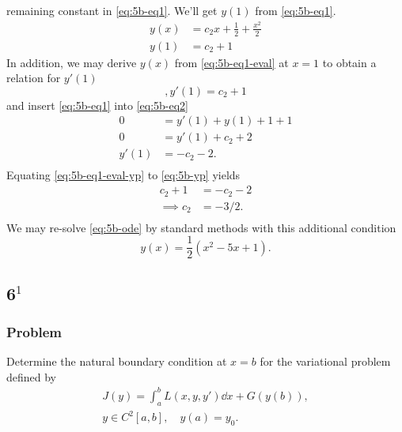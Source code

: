 \documentclass[12pt,twoside]{article}
\begin{document}
remaining constant in \cref{eq:5b-eq1}. We'll get $y(1)$ from \cref{eq:5b-eq1}.
\begin{equation}
  \label{eq:5b-eq1-eval}
  \begin{aligned}
    y(x) &= c_2x + \frac{1}{2} + \frac{x^2}{2} \\
    y(1) &= c_2 + 1
  \end{aligned}
\end{equation}
In addition, we may derive $y(x)$ from \cref{eq:5b-eq1-eval} at $x=1$ to obtain
a relation for $y'(1)$
\begin{equation}
  \label{eq:5b-eq1-eval-yp},
  y'(1) = c_2 + 1
\end{equation}
and insert \cref{eq:5b-eq1} into \cref{eq:5b-eq2}
\begin{equation}
  \label{eq:5b-yp}
  \begin{aligned}
    0 &= y'(1) + y(1) + 1  + 1 \\
    0 &= y'(1) + c_2 + 2 \\
    y'(1) &= -c_2 - 2. \\
  \end{aligned}
\end{equation}
Equating \cref{eq:5b-eq1-eval-yp} to \cref{eq:5b-yp} yields
\begin{equation*}
  \begin{aligned}
    c_2 + 1 &= -c_2 - 2 \\
    \implies c_2 &= -3/2. \\
  \end{aligned}
\end{equation*}
We may re-solve \cref{eq:5b-ode} by standard methods with this additional condition
\begin{equation*}
\boxed{y(x) = \frac{1}{2} \left(x^2-5 x+1\right).}
\end{equation*}

\subsection{6$^1$}
\subsubsection*{Problem}
Determine the natural boundary condition at $x=b$ for the variational problem
defined by
\begin{equation}
  \begin{aligned}
    J(y) = \int_a^b L(x,y,y')\dd{x}+G(y(b)), \\
    y\in C^2[a,b],\quad y(a)=y_0. \\
  \end{aligned}
\end{equation}
\end{document}
